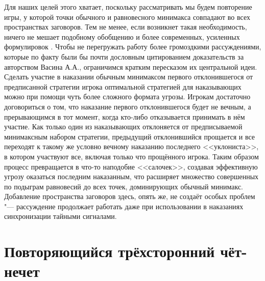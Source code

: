 Для наших целей этого хватает, поскольку рассматривать мы будем повторение игры, у которой точки обычного и равновесного минимакса совпадают во всех пространствах заговоров. Тем не менее, если возникнет такая необходимость, ничего не мешает подобному обобщению и более современных, усиленных формулировок \cite{Vasin}. Чтобы не перегружать работу более громоздкими рассуждениями, которые по факту были бы почти дословным цитированием доказательств за авторством Васина А.А., ограничимся кратким пересказом их центральной идеи. Сделать участие в наказании обычным минимаксом первого отклонившегося от предписанной стратегии игрока оптимальной стратегией для наказывающих можно при помощи чуть более сложного формата угрозы. Игрокам достаточно договориться о том, что наказание первого отклонившегося будет не вечным, а прерывающимся в тот момент, когда кто-либо отказывается принимать в нём участие. Как только один из наказывающих отклоняется от предписываемой минимаксным набором стратегии, предыдущий отклонившийся прощается и все переходят к такому же условно вечному наказанию последнего <<уклониста>>, в котором участвуют все, включая только что прощённого игрока. Таким образом процесс превращается в что-то наподобие <<салочек>>, создавая эффективную угрозу оказаться последним наказанным, что расширяет множество совершенных по подыграм равновесий до всех точек, доминирующих обычный минимакс. Добавление пространства заговоров здесь, опять же, не создаёт особых проблем "--- рассуждение продолжает работать даже при использовании в наказаниях синхронизации тайными сигналами.

\section{Повторяющийся трёхсторонний чёт-нечет}\label{sec:ch3/sect2}


